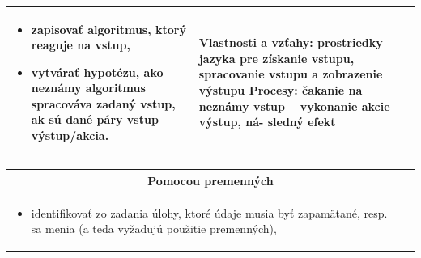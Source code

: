 \documentclass[FP,DP]{tulthesis}
\begin{document}
{{{{\begin{table}[t]
\begin{tabular}{|l|l|}
\begin{minipage}[t]{0.45\textwidth}
\begin{itemize}[leftmargin=*,nosep]
\item zapisovať algoritmus, ktorý reaguje na vstup,
\item vytvárať hypotézu, ako neznámy algoritmus spracováva zadaný
vstup, ak sú dané páry vstup–výstup/akcia.

\end{itemize}
  \end{minipage} &
  \begin{minipage}[t]{0.45\textwidth}
Vlastnosti a vzťahy: prostriedky jazyka pre získanie vstupu, spracovanie
vstupu a zobrazenie výstupu
Procesy: čakanie na neznámy vstup – vykonanie akcie – výstup, ná-
sledný efekt
  \end{minipage}\\\hline
\end{tabular}
\end{table}


{\renewcommand{\arraystretch}{1.4}%
{\renewcommand{\arraystretch}{1.4}%
\begin{table}[t]
\footnotesize
\center
\begin{tabular}{|l|l|}
\hline
\multicolumn{2}{|c|}{Pomocou premenných}\\\hline
\begin{minipage}[t]{0.45\textwidth}
\begin{itemize}[leftmargin=*,nosep]
  	\item identifikovať zo zadania úlohy, ktoré údaje musia byť zapamätané,
resp. sa menia (a teda vyžadujú použitie premenných),


\end{itemize}
\end{minipage}
\end{tabular}
\end{table}}}}}}}
\end{document}
